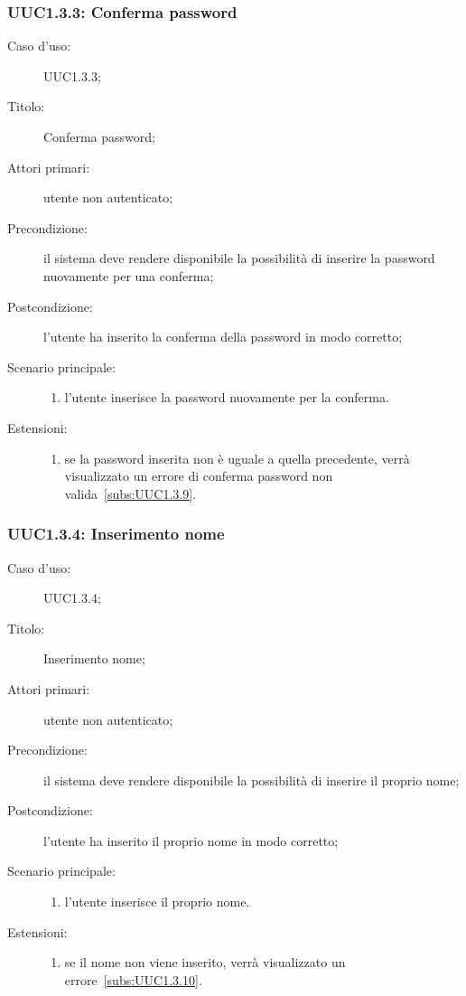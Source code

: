 \documentclass[../../../analisi-dei-requisiti.tex]{subfiles}
\begin{document}
\subsubsection{UUC1.3.3: Conferma password}%
\label{subs:UUC1.3.3}
\begin{description}
  \item[Caso d'uso:] UUC1.3.3;
  \item[Titolo:] Conferma password;
  \item[Attori primari:] utente non autenticato;
  \item[Precondizione:] il sistema deve rendere disponibile la possibilità di inserire la password nuovamente per una conferma;
  \item[Postcondizione:] l'utente ha inserito la conferma della password in modo corretto;
  \item[Scenario principale:]
        \begin{enumerate}
          \item l'utente inserisce la password nuovamente per la conferma.
        \end{enumerate}
  \item[Estensioni:]
        \begin{enumerate}
          \item se la password inserita non è uguale a quella precedente, verrà visualizzato un errore di conferma password non valida~\ref{subs:UUC1.3.9}.
        \end{enumerate}
\end{description}



\subsubsection{UUC1.3.4: Inserimento nome}%
\label{subs:UUC1.3.4}
\begin{description}
  \item[Caso d'uso:] UUC1.3.4;
  \item[Titolo:] Inserimento nome;
  \item[Attori primari:] utente non autenticato;
  \item[Precondizione:] il sistema deve rendere disponibile la possibilità di inserire il proprio nome;
  \item[Postcondizione:] l'utente ha inserito il proprio nome in modo corretto;
  \item[Scenario principale:]
        \begin{enumerate}
          \item l'utente inserisce il proprio nome.
        \end{enumerate}
  \item[Estensioni:]
        \begin{enumerate}
          \item se il nome non viene inserito, verrà visualizzato un errore~\ref{subs:UUC1.3.10}.
        \end{enumerate}
\end{description}
\end{document}
